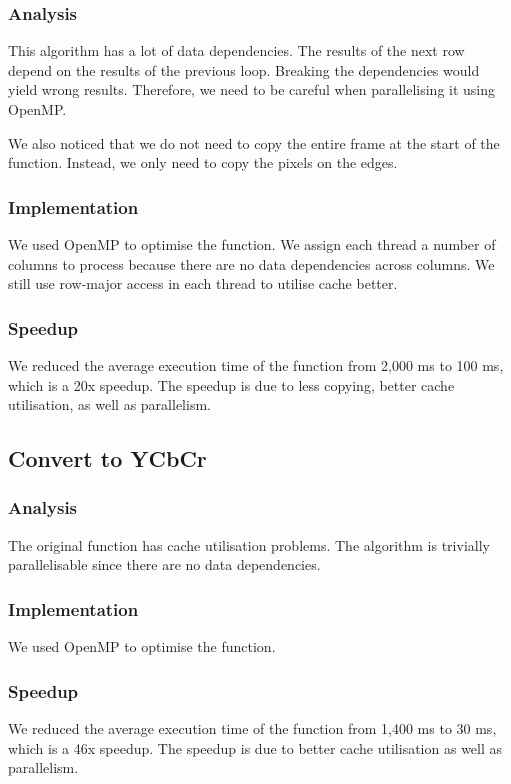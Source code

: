 \documentclass[a4paper]{article}
\begin{document}
\subsubsection{Analysis}
This algorithm has a lot of data dependencies. The results of the next
row depend on the results of the previous loop. Breaking the
dependencies would yield wrong results. Therefore, we need to be
careful when parallelising it using OpenMP.

We also noticed that we do not need to copy the entire frame at the
start of the function. Instead, we only need to copy the pixels on the
edges.

\subsubsection{Implementation}
We used OpenMP to optimise the function. We assign each thread a
number of columns to process because there are no data dependencies
across columns. We still use row-major access in each thread to
utilise cache better. 

\subsubsection{Speedup}
We reduced the average execution time of the function from 2,000 ms to
100 ms, which is a 20x speedup. The speedup is due to less copying,
better cache utilisation, as well as parallelism.

\subsection{Convert to YCbCr}
\subsubsection{Analysis}
The original function has cache utilisation problems. The algorithm is
trivially parallelisable since there are no data dependencies.

\subsubsection{Implementation}
We used OpenMP to optimise the function.


\subsubsection{Speedup}
We reduced the average execution time of the function from 1,400 ms to
30 ms, which is a 46x speedup. The speedup is due to better cache
utilisation as well as parallelism.
\end{document}
